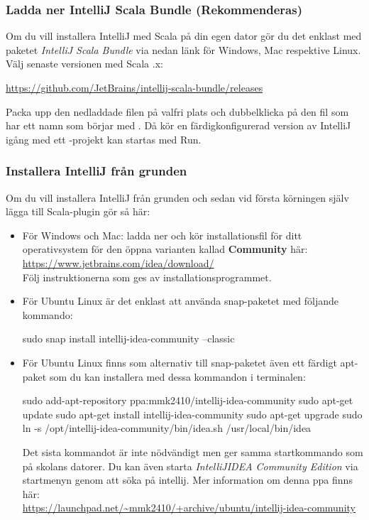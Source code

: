 \subsubsection{Ladda ner IntelliJ Scala Bundle (Rekommenderas)}

Om du vill installera IntelliJ med Scala på din egen dator gör du det enklast med paketet \emph{IntelliJ Scala Bundle} via nedan länk för Windows, Mac respektive Linux. Välj senaste versionen med Scala \ScalaVersion.x: 

\url{https://github.com/JetBrains/intellij-scala-bundle/releases} 

Packa upp den nedladdade filen på valfri plats och dubbelklicka på den fil som har ett namn som börjar med . Då kör en färdigkonfigurerad version av IntelliJ igång med ett -projekt kan startas med Run.

\subsubsection{Installera IntelliJ från grunden}

Om du vill installera IntelliJ från grunden och sedan vid första körningen själv lägga till Scala-plugin gör så här:
\begin{itemize}
  \item För Windows och Mac: ladda ner och kör installationsfil för ditt operativsystem för den öppna varianten kallad \textbf{Community} här: \\
  \url{https://www.jetbrains.com/idea/download/} \\
  Följ instruktionerna som ges av installationsprogrammet.
  
  \item För Ubuntu Linux är det enklast att använda snap-paketet med följande kommando:
\begin{REPLnonum}
sudo snap install intellij-idea-community --classic
\end{REPLnonum}
\item För Ubuntu Linux finns som alternativ till snap-paketet även ett färdigt apt-paket som du kan installera med dessa kommandon i terminalen:
\begin{REPLnonum}
sudo add-apt-repository ppa:mmk2410/intellij-idea-community
sudo apt-get update
sudo apt-get install intellij-idea-community
sudo apt-get upgrade
sudo ln -s /opt/intellij-idea-community/bin/idea.sh /usr/local/bin/idea
\end{REPLnonum}
Det sista kommandot är inte nödvändigt men ger samma startkommando som på skolans datorer. Du kan även starta \textit{IntelliJIDEA Community Edition} via startmenyn genom att söka på intellij.
Mer information om denna ppa finns här:\\ \url{https://launchpad.net/~mmk2410/+archive/ubuntu/intellij-idea-community}

\end{itemize}

